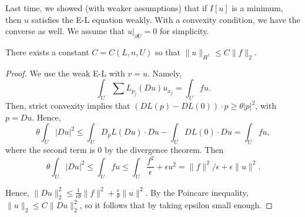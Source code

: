 \documentclass[12pt]{scrartcl}
\newcommand{\<}{\langle}
\renewcommand{\>}{\rangle}
\begin{document}
Last time, we showed (with weaker assumptions) that if $I[u]$ is a minimum, then $u$ satisfies the E-L equation weakly.  With a convexity condition, we have the converse as well.   We assume that $u\vert_{\partial U} = 0$ for simplicity.
\begin{proposition}  There exists a constant $C = C(L, n, U)$ so that $\|u\|_{H^1} \le C\|f\|_2$.  
\end{proposition}
\begin{proof}
We use the weak E-L with $v = u$.  Namely,
$$ \int_U \sum L_{p_j}(Du) u_{x_j} = \int_U fu.$$
Then, strict convexity implies that $(DL(p) - DL(0)) \cdot p \ge \theta |p|^2$, with $p = Du$.    Hence,
$$\theta \int_U |Du|^2 \le \int_U D_pL(Du) \cdot Du - \int_U DL(0) \cdot Du = \int_U fu,$$
where the second term is $0$ by the divergence theorem.   
Then $$\theta \int_U |Du|^2 \le \int_U fu \le \int_U \frac{f^2}{\epsilon} + \epsilon u^2 = \|f\|^2/\epsilon + \epsilon\|u\|^2.$$

Hence, $\|Du\|_2^2 \le \frac{1}{\epsilon \theta} \|f\|^2 + \frac{\epsilon}{\theta}\|u\|^2$.  By the Poincare inequality, $\|u\|_2 \le C\|Du\|_2^2$, so it follows that by taking epsilon small enough.
\end{proof}
\end{document}
